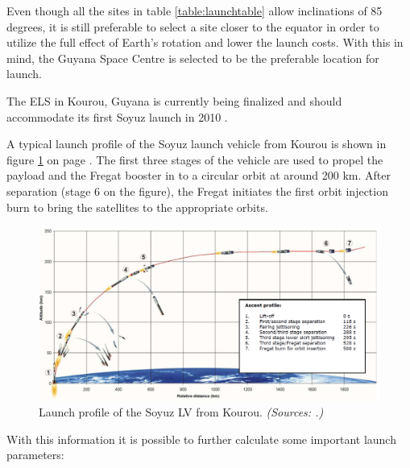 Even though all the sites in table \ref{table:launchtable} allow inclinations of 85 degrees, it is still preferable to select a site closer to the equator in order to utilize the full effect of Earth's rotation and lower the launch costs. With this in mind, the Guyana Space Centre is selected to be the preferable location for launch.

The \ac{ELS} in Kourou, Guyana is currently being finalized and should accommodate its first Soyuz launch in 2010 \cite{arianesoyuz}.

A typical launch profile of the Soyuz launch vehicle from Kourou is shown in figure \ref{fig:launch} on page \pageref{fig:launch}. The first three stages of the vehicle are used to propel the payload and the Fregat booster in to a circular orbit at around 200 km. After separation (stage 6 on the figure), the Fregat initiates the first orbit injection burn to bring the satellites to the appropriate orbits.

\begin{figure}[ht]
\centering
\includegraphics[width=1.0\textwidth, angle=0]{chapters/img/launchprofile.png}
\caption{Launch profile of the Soyuz LV from Kourou. \emph{(Sources: \cite{soyuzman}.)} }
\label{fig:launch}
\end{figure}

With this information it is possible to further calculate some important launch parameters:

